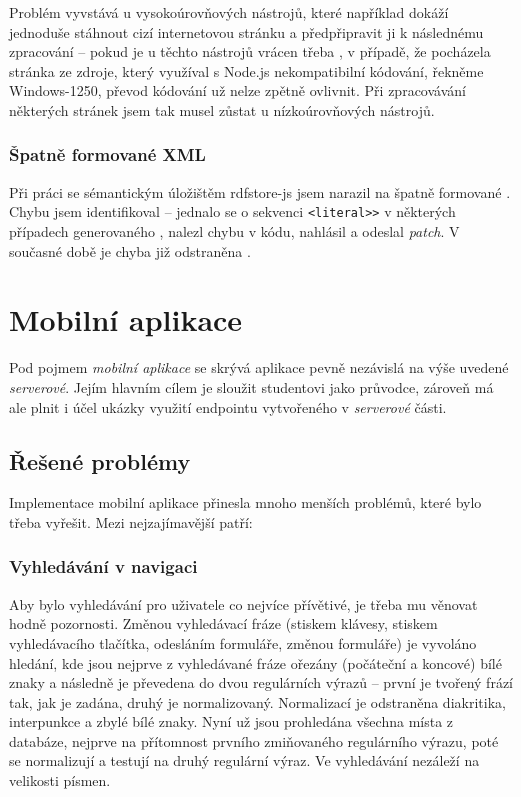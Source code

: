 Problém vyvstává u vysokoúrovňových nástrojů, které například dokáží jednoduše stáhnout cizí internetovou stránku a předpřipravit ji k následnému zpracování -- pokud je u těchto nástrojů vrácen třeba , v případě, že pocházela stránka ze zdroje, který využíval s Node.js nekompatibilní kódování, řekněme Windows-1250, převod kódování už nelze zpětně ovlivnit. Při zpracovávání některých stránek jsem tak musel zůstat u nízkoúrovňových nástrojů.

\subsubsection{Špatně formované XML}
Při práci se sémantickým úložištěm rdfstore-js jsem narazil na špatně formované . Chybu jsem identifikoval -- jednalo se o sekvenci \verb|<literal>>| v některých případech generovaného , nalezl chybu v kódu, nahlásil a odeslal \textit{patch}. V současné době je chyba již odstraněna \cite{IssueLiteral}.



\section{Mobilní aplikace}
Pod pojmem \textit{mobilní aplikace} se skrývá aplikace pevně nezávislá na výše uvedené \textit{serverové}. Jejím hlavním cílem je sloužit studentovi   jako průvodce, zároveň má ale plnit i účel ukázky využití  endpointu vytvořeného v \textit{serverové} části.

\subsection{Řešené problémy}
Implementace mobilní aplikace přinesla mnoho menších problémů, které bylo třeba vyřešit. Mezi nejzajímavější patří:

\subsubsection{Vyhledávání v navigaci}
Aby bylo vyhledávání pro uživatele co nejvíce přívětivé, je třeba mu věnovat hodně pozornosti. Změnou vyhledávací fráze (stiskem klávesy, stiskem vyhledávacího tlačítka, odesláním formuláře, změnou formuláře) je vyvoláno hledání, kde jsou nejprve z vyhledávané fráze ořezány (počáteční a koncové) bílé znaky a následně je převedena do dvou regulárních výrazů -- první je tvořený frází tak, jak je zadána, druhý je normalizovaný. Normalizací je odstraněna diakritika, interpunkce a zbylé bílé znaky. Nyní už jsou prohledána všechna místa z databáze, nejprve na přítomnost prvního zmiňovaného regulárního výrazu, poté se normalizují a testují na druhý regulární výraz. Ve vyhledávání nezáleží na velikosti písmen.

